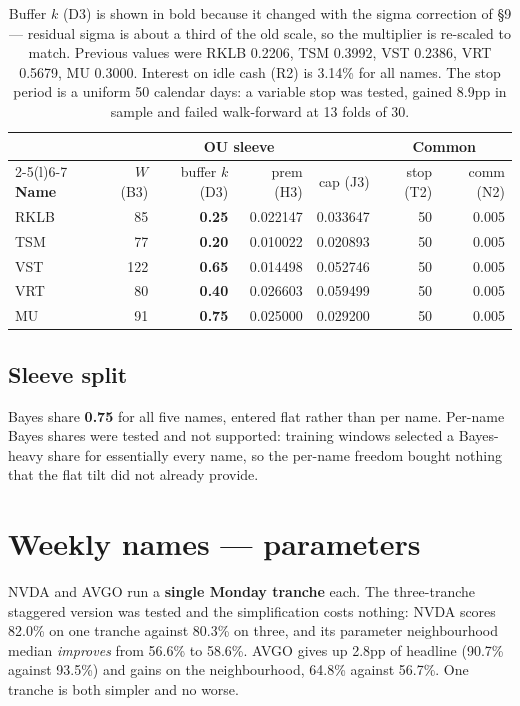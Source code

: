 \documentclass[11pt]{article}
\begin{document}
\begin{table}[H]\centering\footnotesize
\setlength{\tabcolsep}{5pt}
\begin{tabular}{lrrrrrr}
\toprule
& \multicolumn{4}{c}{\textbf{OU sleeve}} & \multicolumn{2}{c}{\textbf{Common}}\\
\cmidrule(lr){2-5}\cmidrule(l){6-7}
\textbf{Name} & $W$ (B3) & buffer $k$ (D3) & prem (H3) & cap (J3) & stop (T2) & comm (N2)\\
\midrule
\rowcolor{bckeep} RKLB & 85  & \textbf{0.25} & 0.022147 & 0.033647 & 50 & 0.005\\
TSM  & 77  & \textbf{0.20} & 0.010022 & 0.020893 & 50 & 0.005\\
\rowcolor{bckeep} VST  & 122 & \textbf{0.65} & 0.014498 & 0.052746 & 50 & 0.005\\
VRT  & 80  & \textbf{0.40} & 0.026603 & 0.059499 & 50 & 0.005\\
\rowcolor{bckeep} MU   & 91  & \textbf{0.75} & 0.025000 & 0.029200 & 50 & 0.005\\
\bottomrule
\end{tabular}
\caption{Buffer $k$ (D3) is shown in bold because it changed with the sigma correction of
\S9 --- residual sigma is about a third of the old scale, so the multiplier is re-scaled to match.
Previous values were RKLB 0.2206, TSM 0.3992, VST 0.2386, VRT 0.5679, MU 0.3000. Interest on idle
cash (R2) is 3.14\% for all names. The stop period is a uniform 50
calendar days: a variable stop was tested, gained 8.9pp in sample and failed walk-forward at
13 folds of 30.}
\end{table}

\subsection{Sleeve split}

Bayes share \textbf{0.75} for all five names, entered flat rather than per name. Per-name Bayes
shares were tested and not supported: training windows selected a Bayes-heavy share for
essentially every name, so the per-name freedom bought nothing that the flat tilt did not
already provide.

\section{Weekly names --- parameters}

NVDA and AVGO run a \textbf{single Monday tranche} each. The three-tranche staggered version was
tested and the simplification costs nothing: NVDA scores 82.0\% on one tranche against 80.3\% on
three, and its parameter neighbourhood median \emph{improves} from 56.6\% to 58.6\%. AVGO gives
up 2.8pp of headline (90.7\% against 93.5\%) and gains on the neighbourhood, 64.8\% against
56.7\%. One tranche is both simpler and no worse.
\end{document}
